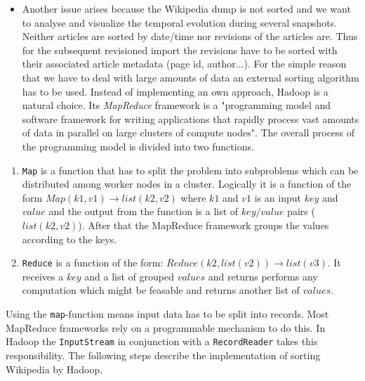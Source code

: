 \begin{itemize}
\item Another issue arises because the Wikipedia dump is not sorted and we want to analyse and visualize the temporal evolution during several snapshots. Neither articles are sorted by date/time nor revisions of the articles are. Thus for the subsequent revisioned import the revisions have to be sorted with their associated article metadata (page id, author...). For the simple reason that we have to deal with large amounts of data an external sorting algorithm has to be used. Instead of implementing an own approach, Hadoop is a natural choice. Its \emph{MapReduce} framework is a "programming model and software framework for writing applications that rapidly process vast amounts of data in parallel on large clusters of compute nodes". The overall process of the programming model is divided into two functions.
\end{itemize}

\begin{enumerate}
\item \texttt{Map} is a function that has to split the problem into subproblems which can be distributed among worker nodes in a cluster. Logically it is a function of the form $Map(k1,v1) \rightarrow list(k2,v2)$ where $k1$ and $v1$ is an input $key$ and $value$ and the output from the function is a list of $key/value$ pairs ($list(k2, v2)$). After that the MapReduce framework groups the values according to the keys.
\item \texttt{Reduce} is a function of the form: $Reduce(k2, list (v2)) \rightarrow list(v3)$. It receives a $key$ and a list of grouped $values$ and returns performs any computation which might be feasable and returns another list of $values$.
\end{enumerate}

Using the \texttt{map}-function means input data has to be split into records. Most MapReduce frameworks rely on a programmable mechanism to do this. In Hadoop the \texttt{InputStream} in conjunction with a \texttt{RecordReader} takes this responsibility. The following steps describe the implementation of sorting Wikipedia by Hadoop.

